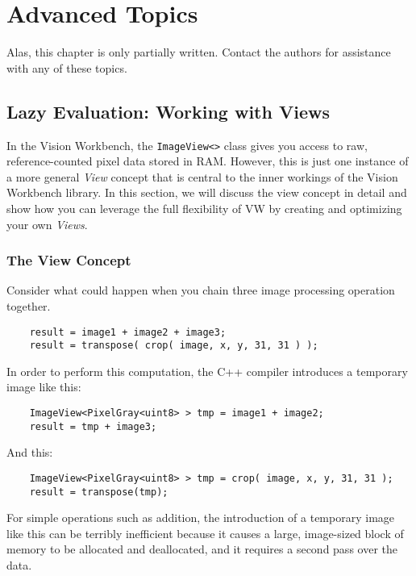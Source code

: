 \chapter{Advanced Topics}\label{ch:advanced-topics}

Alas, this chapter is only partially written.  Contact the authors for
assistance with any of these topics.

\section{Lazy Evaluation: Working with Views}\label{sec:views}

In the Vision Workbench, the \verb#ImageView<># class gives you access
to raw, reference-counted pixel data stored in RAM.  However, this is
just one instance of a more general {\em View} concept that is central
to the inner workings of the Vision Workbench library.  In this
section, we will discuss the view concept in detail and show how you
can leverage the full flexibility of VW by creating and optimizing
your own {\em Views}.

\subsection {The View Concept}

Consider what could happen when you chain three image processing
operation together.

\begin{verbatim}
    result = image1 + image2 + image3;
    result = transpose( crop( image, x, y, 31, 31 ) );
\end{verbatim}

In order to perform this computation, the C++ compiler introduces a
temporary image like this:

\begin{verbatim}
    ImageView<PixelGray<uint8> > tmp = image1 + image2;
    result = tmp + image3;
\end{verbatim}

And this:

\begin{verbatim}
    ImageView<PixelGray<uint8> > tmp = crop( image, x, y, 31, 31 );
    result = transpose(tmp);
\end{verbatim}

For simple operations such as addition, the introduction of a
temporary image like this can be terribly inefficient because it
causes a large, image-sized block of memory to be allocated and
deallocated, and it requires a second pass over the data.  

